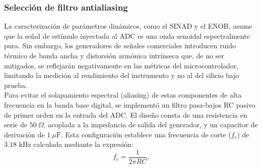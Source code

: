 \documentclass{article}
\begin{document}
\subsubsection{Selección de filtro antialiasing}
La caracterización de parámetros dinámicos, como el SINAD y el ENOB, asume que la señal de estímulo inyectada al ADC es una onda senoidal espectralmente pura. Sin embargo, los generadores de señales comerciales introducen ruido térmico de banda ancha y distorsión armónica intrínseca que, de no ser mitigados, se reflejarán negativamente en las métricas del microcontrolador, limitando la medición al rendimiento del instrumento y no al del silicio bajo prueba.
\\
Para evitar el solapamiento espectral (aliasing) de estas componentes de alta frecuencia en la banda base digital, se implementó un filtro pasa-bajos RC pasivo de primer orden en la entrada del ADC. El diseño consta de una resistencia en serie de $50\ \Omega$, acoplada a la impedancia de salida del generador, y un capacitor de derivación de $1\ \mu\text{F}$. Esta configuración establece una frecuencia de corte ($f_c$) de $3.18\text{ kHz}$ calculada mediante la expresión:\\
\begin{equation}
    f_c = \frac{1}{2\pi R C}.
\end{equation}
\end{document}
